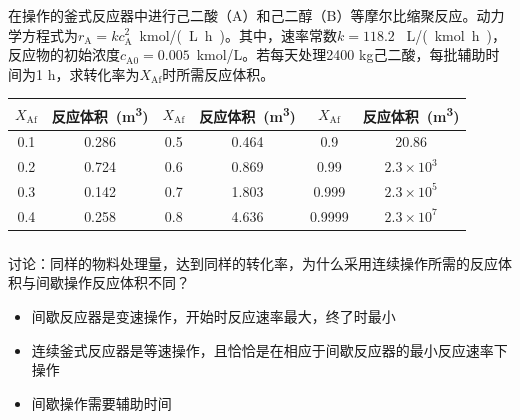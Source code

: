 \documentclass[dvipsnames, svgnames, x11names]{beamer}
\begin{document}
\begin{frame}[t]
    \frametitle{}
    \begin{question}
        在操作的釜式反应器中进行己二酸（A）和己二醇（B）等摩尔比缩聚反应。动力学方程式为$r_\mathrm{A} = kc_\mathrm{A}^2$\ \si{kmol/(L.h)}。其中，速率常数$k = 118.2$ \ \si{L/(kmol.h)}，反应物的初始浓度$c_\mathrm{A0} = 0.005$\ \si{kmol/L}。若每天处理2400 kg己二酸，每批辅助时间为1 h，求转化率为$X_\mathrm{Af}$时所需反应体积。
        \begin{table}
            \centering
            \begin{tabular}{cc||cc||cc}
                \bottomrule
                $X_\mathrm{Af}$ & 反应体积\ (\si{m^3}) & $X_\mathrm{Af}$ & 反应体积\ (\si{m^3}) & $X_\mathrm{Af}$ & 反应体积\ (\si{m^3}) \\ \hline
                0.1 & 0.286 & 0.5 & 0.464 & 0.9 & 20.86 \\ 
                0.2 & 0.724 & 0.6 & 0.869 & 0.99 & $2.3\times 10^3$ \\ 
                0.3 & 0.142 & 0.7 & 1.803 & 0.999 & $2.3\times 10^5$ \\ 
                0.4 & 0.258 & 0.8 & 4.636 & 0.9999 & $2.3\times 10^{7}$ \\ \toprule
            \end{tabular}
        \end{table}
    \end{question}
\end{frame}


\begin{frame}[t]
    \frametitle{}
    \begin{question}
        讨论：同样的物料处理量，达到同样的转化率，为什么采用连续操作所需的反应体积与间歇操作反应体积不同？
        \tcblower
        \pause
        \begin{itemize}
          \item 间歇反应器是变速操作，开始时反应速率最大，终了时最小
          \item 连续釜式反应器是等速操作，且恰恰是在相应于间歇反应器的最小反应速率下操作
          \item 间歇操作需要辅助时间
        \end{itemize}
    \end{question}
\end{frame}
\end{document}
